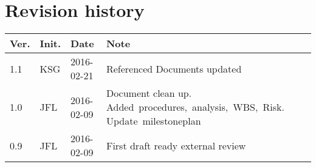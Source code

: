 \chapter*{Revision history}
\label{app:rev_his}

\renewcommand\arraystretch{1.5}
\begin{tabular}{b{1cm} b{1cm} b{2cm} b{8cm}}
    \textbf{Ver.} & \textbf{Init.} & \textbf{Date} & \textbf{Note} \\
    \hline
    1.1 & KSG & 2016-02-21 & Referenced Documents updated \\
    \hline
    1.0 & JFL & 2016-02-09 & Document clean up. Added~procedures,~analysis,~WBS,~Risk. Update~milestoneplan \\
    \hline
    0.9 & JFL & 2016-02-09 & First draft ready external review \\
\end{tabular}
\renewcommand\arraystretch{1}